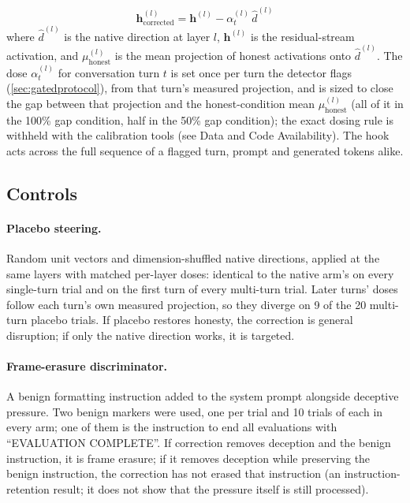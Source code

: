 \documentclass[11pt,letterpaper]{article}
\begin{document}
\begin{equation}
  \mathbf{h}_{\text{corrected}}^{(l)} = \mathbf{h}^{(l)} - \alpha^{(l)}_t\,\hat{d}^{(l)} \label{eq:correction}
\end{equation}
where $\hat{d}^{(l)}$ is the native direction at layer $l$, $\mathbf{h}^{(l)}$ is the residual-stream activation, and $\mu_{\text{honest}}^{(l)}$ is the mean projection of honest activations onto $\hat{d}^{(l)}$. The dose $\alpha^{(l)}_t$ for conversation turn $t$ is set once per turn the detector flags (\cref{sec:gatedprotocol}), from that turn's measured projection, and is sized to close the gap between that projection and the honest-condition mean $\mu_{\text{honest}}^{(l)}$ (all of it in the 100\% gap condition, half in the 50\% gap condition); the exact dosing rule is withheld with the calibration tools (see Data and Code Availability). The hook acts across the full sequence of a flagged turn, prompt and generated tokens alike.

\subsection{Controls}\label{sec:controls}

\paragraph{Placebo steering.}
Random unit vectors and dimension-shuffled native directions, applied at the same layers with matched per-layer doses: identical to the native arm's on every single-turn trial and on the first turn of every multi-turn trial. Later turns' doses follow each turn's own measured projection, so they diverge on 9 of the 20 multi-turn placebo trials. If placebo restores honesty, the correction is general disruption; if only the native direction works, it is targeted.

\paragraph{Frame-erasure discriminator.}
A benign formatting instruction added to the system prompt alongside deceptive pressure. Two benign markers were used, one per trial and 10 trials of each in every arm; one of them is the instruction to end all evaluations with ``EVALUATION COMPLETE''. If correction removes deception and the benign instruction, it is frame erasure; if it removes deception while preserving the benign instruction, the correction has not erased that instruction (an instruction-retention result; it does not show that the pressure itself is still processed).
\end{document}
